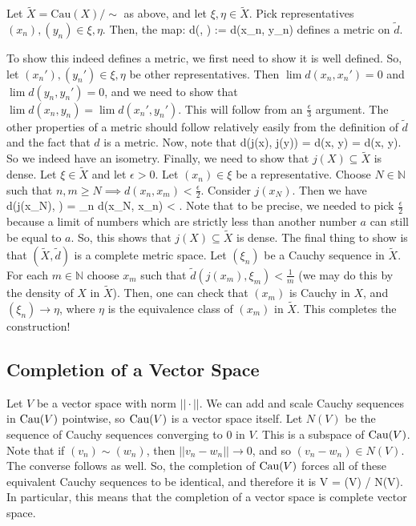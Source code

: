 	\begin{prop}
		Let $\tilde X = \mathrm{Cau}(X)/\sim$ as above, and let $\xi, \eta\in \tilde X$. Pick representatives $(x_n), (y_n)\in\xi, \eta$. Then, the map:
		\eq
			\tilde d(\xi, \eta) := \lim d(x_n, y_n)
		\qe
		defines a metric on $\tilde d$.
	\end{prop}
	
	To show this indeed defines a metric, we first need to show it is well defined. So, let $(x_n'), (y_n')\in\xi, \eta$ be other representatives. Then $\lim d(x_n, x_n') 
	= 0$ and $\lim d(y_n, y_n') = 0$, and we need to show that $\lim d(x_n, y_n) = \lim d(x_n', y_n')$. This will follow from an $\frac{\epsilon}{3}$ argument. The 
	other properties of a metric should follow relatively easily from the definition of $\tilde d$ and the fact that $d$ is a metric. Now, 
	note that
	\eq
		\tilde d(j(x), j(y)) = \lim d(x, y) = d(x, y).
	\qe
	So we indeed have an isometry. Finally, we need to show that $j(X)\subseteq\tilde X$ is dense. Let $\xi\in\tilde X$ and let $\epsilon > 0$. Let $(x_n)\in\xi$ be a 
	representative. Choose $N\in\mathbb N$ such that $n, m\geq N\implies d(x_n, x_m) < \frac{\epsilon}{2}$. Consider $j(x_N)$. Then we have
	\eq
		\tilde d(j(x_N), \xi) = \lim_{n\rightarrow\infty} d(x_N, x_n) \leq {} < \epsilon.
	\qe
	Note that to be precise, we needed to pick $\frac{\epsilon}{2}$ because a limit of numbers which are strictly less than another number $a$ can still be equal to 
	$a$. So, this shows that $j(X)\subseteq\tilde X$ is dense. The final thing to show is that $(\tilde X, \tilde d)$ is a complete metric space. Let $(\xi_n)$ be a 
	Cauchy sequence in $\tilde X$. For each $m\in\mathbb N$ choose $x_m$ such that $\tilde d(j(x_m), \xi_m) < \frac{1}{m}$ (we may do this by the density of $X$ 
	in $\tilde X$). Then, one can check that $(x_m)$ is Cauchy in $X$, and $(\xi_n)\rightarrow\eta$, where $\eta$ is the equivalence class of $(x_m)$ in $\tilde X$.
	This completes the construction!
	
	\subsection{Completion of a Vector Space}
	
	Let $V$ be a vector space with norm $||\cdot||$. We can add and scale Cauchy sequences in $\mathrm{Cau}(V)$ pointwise, so $\mathrm{Cau}(V)$ is a vector space itself. 
	Let $N(V)$ be the sequence of Cauchy sequences converging to $0$ in $V$. This is a subspace of $\mathrm{Cau}(V)$. Note that if $(v_n)\sim (w_n)$, then $||v_n - 
	w_n||\rightarrow 0$, and so $(v_n - w_n)\in N(V)$. The converse follows as well. So, the completion of $\mathrm{Cau}(V)$ forces all of these equivalent Cauchy 
	sequences to be identical, and therefore it is
	\eq
		\tilde V = \Cau(V) / N(V).
	\qe
	In particular, this means that the completion of a vector space is complete vector space.

